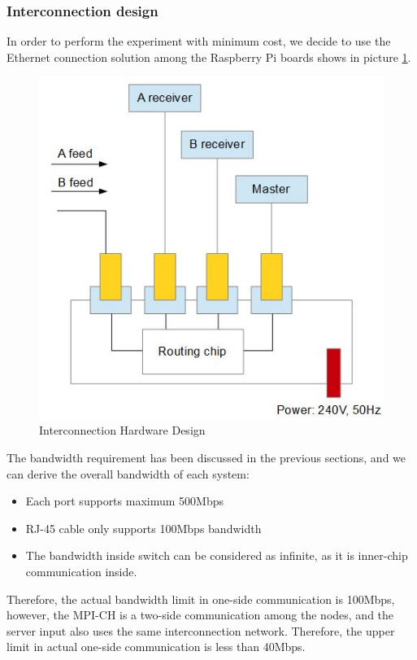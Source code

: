 \documentclass[11pt,openright,a4paper]{report}
\begin{document}
\subsubsection{Interconnection design}
In order to perform the experiment with minimum cost, we decide to use the Ethernet connection solution among the Raspberry Pi boards shows in picture \ref{fig:hardwareDesign}.\\  
\begin{figure}[H]
\centering
\includegraphics[width=0.5\linewidth]{picture/hardwareDesign}
\caption{Interconnection Hardware Design}
\label{fig:hardwareDesign}
\end{figure}
The bandwidth requirement has been discussed in the previous sections, and we can derive the overall bandwidth of each system:\\
\begin{itemize}
	\item Each port supports maximum 500Mbps
	\item RJ-45 cable only supports 100Mbps bandwidth\cite{kunz1999rj}
	\item The bandwidth inside switch can be considered as infinite, as it is inner-chip communication inside.
\end{itemize}
Therefore, the actual bandwidth limit in one-side communication is 100Mbps, however, the MPI-CH is a two-side communication among the nodes, and the server input also uses the same interconnection network. Therefore, the upper limit in actual one-side communication is less than 40Mbps.\\
\end{document}
